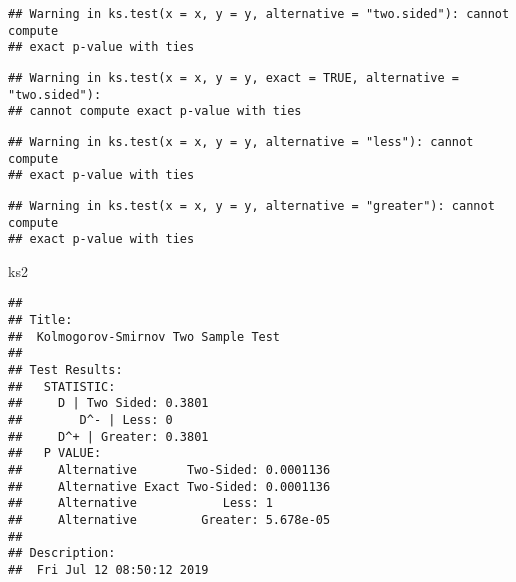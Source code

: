 \documentclass[]{article}
\newenvironment{Shaded}{\begin{snugshade}}{\end{snugshade}}
\newcommand{\CommentTok}[1]{\textcolor[rgb]{0.56,0.35,0.01}{\textit{#1}}}
\newcommand{\KeywordTok}[1]{\textcolor[rgb]{0.13,0.29,0.53}{\textbf{#1}}}
\newcommand{\NormalTok}[1]{#1}
\newcommand{\OperatorTok}[1]{\textcolor[rgb]{0.81,0.36,0.00}{\textbf{#1}}}
\newcommand{\StringTok}[1]{\textcolor[rgb]{0.31,0.60,0.02}{#1}}
\begin{document}
\begin{Shaded}
\end{Shaded}

\begin{verbatim}
## Warning in ks.test(x = x, y = y, alternative = "two.sided"): cannot compute
## exact p-value with ties
\end{verbatim}

\begin{verbatim}
## Warning in ks.test(x = x, y = y, exact = TRUE, alternative = "two.sided"):
## cannot compute exact p-value with ties
\end{verbatim}

\begin{verbatim}
## Warning in ks.test(x = x, y = y, alternative = "less"): cannot compute
## exact p-value with ties
\end{verbatim}

\begin{verbatim}
## Warning in ks.test(x = x, y = y, alternative = "greater"): cannot compute
## exact p-value with ties
\end{verbatim}

\begin{Shaded}
\begin{Highlighting}[]
\NormalTok{ks2}
\end{Highlighting}
\end{Shaded}

\begin{verbatim}
## 
## Title:
##  Kolmogorov-Smirnov Two Sample Test
## 
## Test Results:
##   STATISTIC:
##     D | Two Sided: 0.3801
##        D^- | Less: 0
##     D^+ | Greater: 0.3801
##   P VALUE:
##     Alternative       Two-Sided: 0.0001136 
##     Alternative Exact Two-Sided: 0.0001136 
##     Alternative            Less: 1 
##     Alternative         Greater: 5.678e-05 
## 
## Description:
##  Fri Jul 12 08:50:12 2019
\end{verbatim}
\end{document}
